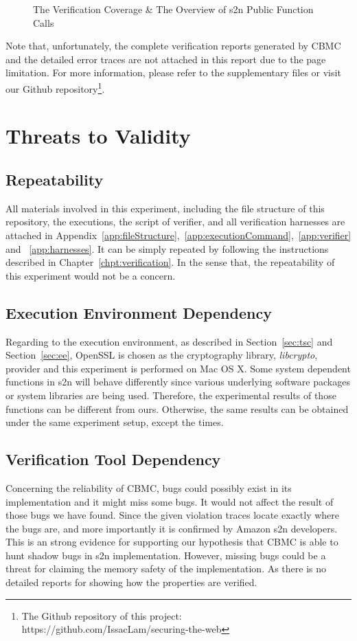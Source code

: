 \begin{figure}[tp]
    \caption{The Verification Coverage \& The Overview of s2n Public Function Calls}
    \label{fig:tvcntospfc}
\end{figure}

Note that, unfortunately, the complete verification reports generated by CBMC and the detailed error traces are not attached in this report due to the page limitation. For more information, please refer to the supplementary files or visit our Github repository\footnote{The Github repository of this project: https://github.com/IssacLam/securing-the-web}.


\section{Threats to Validity} %
\subsection{Repeatability}
All materials involved in this experiment, including the file structure of this repository, the executions, the script of verifier, and all verification harnesses are attached in Appendix~\ref{app:fileStructure},~\ref{app:executionCommand},~\ref{app:verifier} and ~\ref{app:harnesses}. It can be simply repeated by following the instructions described in Chapter~\ref{chpt:verification}. In the sense that, the repeatability of this experiment would not be a concern. 

\subsection{Execution Environment Dependency}
Regarding to the execution environment, as described in Section~\ref{sec:tsc} and Section~\ref{sec:ee}, OpenSSL is chosen as the cryptography library, \textit{libcrypto}, provider and this experiment is performed on Mac OS X. Some system dependent functions in s2n will behave differently since various underlying software packages or system libraries are being used. Therefore, the experimental results of those functions can be different from ours. Otherwise, the same results can be obtained under the same experiment setup, except the times. 

\subsection{Verification Tool Dependency}
Concerning the reliability of CBMC, bugs could possibly exist in its implementation and it might miss some bugs. It would not affect the result of those bugs we have found. Since the given violation traces locate exactly where the bugs are, and more importantly it is confirmed by Amazon s2n developers. This is an strong evidence for supporting our hypothesis that CBMC is able to hunt shadow bugs in s2n implementation. However, missing bugs could be a threat for claiming the memory safety of the implementation. As there is no detailed reports for showing how the properties are verified. 

